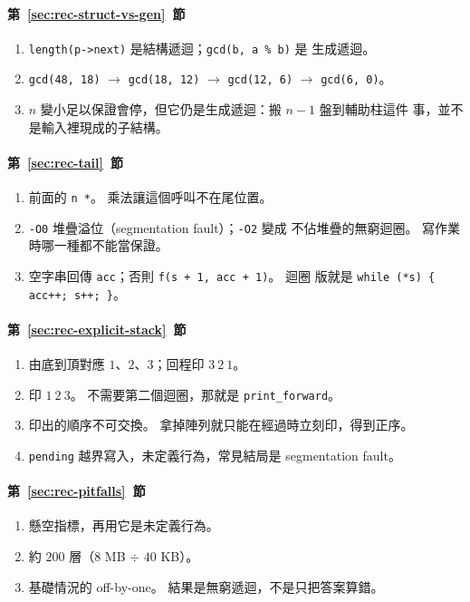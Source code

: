 \paragraph{第~\ref{sec:rec-struct-vs-gen}~節}
\begin{enumerate}
\item \texttt{length(p->next)} 是結構遞迴；\texttt{gcd(b, a \% b)} 是
生成遞迴。
\item \texttt{gcd(48, 18)} $\rightarrow$ \texttt{gcd(18, 12)}
$\rightarrow$ \texttt{gcd(12, 6)} $\rightarrow$ \texttt{gcd(6, 0)}。
\item $n$ 變小足以保證會停，但它仍是生成遞迴：搬 $n-1$ 盤到輔助柱這件
事，並不是輸入裡現成的子結構。
\end{enumerate}

\paragraph{第~\ref{sec:rec-tail}~節}
\begin{enumerate}
\item 前面的 \texttt{n *}。 乘法讓這個呼叫不在尾位置。
\item \texttt{-O0} 堆疊溢位（segmentation fault）；\texttt{-O2} 變成
不佔堆疊的無窮迴圈。 寫作業時哪一種都不能當保證。
\item 空字串回傳 \texttt{acc}；否則 \texttt{f(s + 1, acc + 1)}。 迴圈
版就是 \texttt{while (*s) \{ acc++; s++; \}}。
\end{enumerate}

\paragraph{第~\ref{sec:rec-explicit-stack}~節}
\begin{enumerate}
\item 由底到頂對應 $1$、$2$、$3$；回程印 $3\ 2\ 1$。
\item 印 $1\ 2\ 3$。 不需要第二個迴圈，那就是 \texttt{print\_forward}。
\item 印出的順序不可交換。 拿掉陣列就只能在經過時立刻印，得到正序。
\item \texttt{pending} 越界寫入，未定義行為，常見結局是 segmentation
fault。
\end{enumerate}

\paragraph{第~\ref{sec:rec-pitfalls}~節}
\begin{enumerate}
\item 懸空指標，再用它是未定義行為。
\item 約 $200$ 層（$8$ MB $\div$ $40$ KB）。
\item 基礎情況的 off-by-one。 結果是無窮遞迴，不是只把答案算錯。
\end{enumerate}

